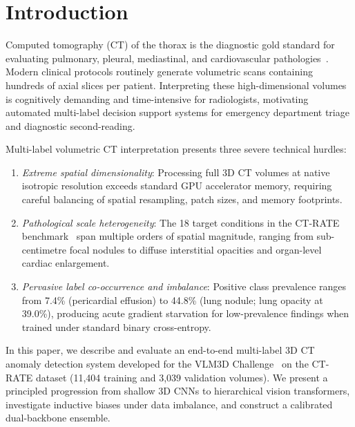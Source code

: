 \documentclass[runningheads]{llncs}
\begin{document}
\section{Introduction}
Computed tomography (CT) of the thorax is the diagnostic gold standard for evaluating pulmonary, pleural, mediastinal, and cardiovascular pathologies~\cite{ardila2019}. Modern clinical protocols routinely generate volumetric scans containing hundreds of axial slices per patient. Interpreting these high-dimensional volumes is cognitively demanding and time-intensive for radiologists, motivating automated multi-label decision support systems for emergency department triage and diagnostic second-reading.

Multi-label volumetric CT interpretation presents three severe technical hurdles:
\begin{enumerate}
\setlength{\itemsep}{1pt}\setlength{\parskip}{0pt}
\item \textit{Extreme spatial dimensionality}: Processing full 3D CT volumes at native isotropic resolution exceeds standard GPU accelerator memory, requiring careful balancing of spatial resampling, patch sizes, and memory footprints.
\item \textit{Pathological scale heterogeneity}: The 18 target conditions in the CT-RATE benchmark~\cite{ctrate2024} span multiple orders of spatial magnitude, ranging from sub-centimetre focal nodules to diffuse interstitial opacities and organ-level cardiac enlargement.
\item \textit{Pervasive label co-occurrence and imbalance}: Positive class prevalence ranges from 7.4\% (pericardial effusion) to 44.8\% (lung nodule; lung opacity at 39.0\%), producing acute gradient starvation for low-prevalence findings when trained under standard binary cross-entropy.
\end{enumerate}

In this paper, we describe and evaluate an end-to-end multi-label 3D CT anomaly detection system developed for the VLM3D Challenge~\cite{vlm3d2026} on the CT-RATE dataset (11,404 training and 3,039 validation volumes). We present a principled progression from shallow 3D CNNs to hierarchical vision transformers, investigate inductive biases under data imbalance, and construct a calibrated dual-backbone ensemble.
\end{document}
